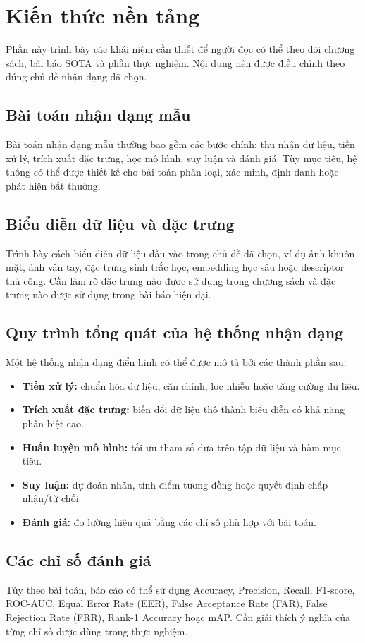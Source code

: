 \section{Kiến thức nền tảng}

Phần này trình bày các khái niệm cần thiết để người đọc có thể theo dõi chương sách, bài báo SOTA và phần thực nghiệm. Nội dung nên được điều chỉnh theo đúng chủ đề nhận dạng đã chọn.

\subsection{Bài toán nhận dạng mẫu}
Bài toán nhận dạng mẫu thường bao gồm các bước chính: thu nhận dữ liệu, tiền xử lý, trích xuất đặc trưng, học mô hình, suy luận và đánh giá. Tùy mục tiêu, hệ thống có thể được thiết kế cho bài toán phân loại, xác minh, định danh hoặc phát hiện bất thường.

\subsection{Biểu diễn dữ liệu và đặc trưng}
Trình bày cách biểu diễn dữ liệu đầu vào trong chủ đề đã chọn, ví dụ ảnh khuôn mặt, ảnh vân tay, đặc trưng sinh trắc học, embedding học sâu hoặc descriptor thủ công. Cần làm rõ đặc trưng nào được sử dụng trong chương sách và đặc trưng nào được sử dụng trong bài báo hiện đại.

\subsection{Quy trình tổng quát của hệ thống nhận dạng}
Một hệ thống nhận dạng điển hình có thể được mô tả bởi các thành phần sau:
\begin{itemize}
    \item \textbf{Tiền xử lý:} chuẩn hóa dữ liệu, căn chỉnh, lọc nhiễu hoặc tăng cường dữ liệu.
    \item \textbf{Trích xuất đặc trưng:} biến đổi dữ liệu thô thành biểu diễn có khả năng phân biệt cao.
    \item \textbf{Huấn luyện mô hình:} tối ưu tham số dựa trên tập dữ liệu và hàm mục tiêu.
    \item \textbf{Suy luận:} dự đoán nhãn, tính điểm tương đồng hoặc quyết định chấp nhận/từ chối.
    \item \textbf{Đánh giá:} đo lường hiệu quả bằng các chỉ số phù hợp với bài toán.
\end{itemize}

\subsection{Các chỉ số đánh giá}
Tùy theo bài toán, báo cáo có thể sử dụng Accuracy, Precision, Recall, F1-score, ROC-AUC, Equal Error Rate (EER), False Acceptance Rate (FAR), False Rejection Rate (FRR), Rank-1 Accuracy hoặc mAP. Cần giải thích ý nghĩa của từng chỉ số được dùng trong thực nghiệm.